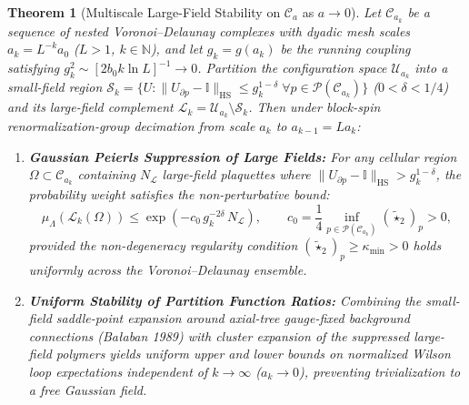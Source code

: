 \documentclass[11pt, a4paper]{article}
\newtheorem{theorem}{Theorem}[section]
\theoremstyle{definition}
\theoremstyle{remark}
\begin{document}
\begin{theorem}[Multiscale Large-Field Stability on $\mathcal{C}_{a}$ as $a \to 0$]
\label{thm:large_field}
Let $\mathcal{C}_{a_{k}}$ be a sequence of nested Voronoi--Delaunay complexes with dyadic mesh scales $a_{k} = L^{-k}a_{0}$ ($L > 1$, $k \in \mathbb{N}$), and let $g_{k} = g(a_{k})$ be the running coupling satisfying $g_{k}^{2} \sim [2b_{0}k\ln L]^{-1} \to 0$. Partition the configuration space $\mathcal{U}_{a_{k}}$ into a small-field region $\mathcal{S}_{k} = \{U : \|U_{\partial p} - \mathbb{I}\|_{\mathrm{HS}} \le g_{k}^{1-\delta} \;\forall p \in \mathcal{P}(\mathcal{C}_{a_{k}})\}$ ($0 < \delta < 1/4$) and its large-field complement $\mathcal{L}_{k} = \mathcal{U}_{a_{k}} \setminus \mathcal{S}_{k}$. Then under block-spin renormalization-group decimation from scale $a_{k}$ to $a_{k-1} = L a_{k}$:
\begin{enumerate}
  \item \textbf{Gaussian Peierls Suppression of Large Fields:} For any cellular region $\Omega \subset \mathcal{C}_{a_{k}}$ containing $N_{\mathcal{L}}$ large-field plaquettes where $\|U_{\partial p} - \mathbb{I}\|_{\mathrm{HS}} > g_{k}^{1-\delta}$, the probability weight satisfies the non-perturbative bound:
  \begin{equation}
    \mu_{\Lambda}\!\left(\mathcal{L}_{k}(\Omega)\right) \le \exp\!\left(-c_{0}\,g_{k}^{-2\delta}\,N_{\mathcal{L}}\right), \qquad c_{0} = \frac{1}{4}\inf_{p \in \mathcal{P}(\mathcal{C}_{a_{k}})} (\tilde{\star}_{2})_{p} > 0,
  \end{equation}
  provided the non-degeneracy regularity condition $(\tilde{\star}_{2})_{p} \ge \kappa_{\min} > 0$ holds uniformly across the Voronoi--Delaunay ensemble.
  \item \textbf{Uniform Stability of Partition Function Ratios:} Combining the small-field saddle-point expansion around axial-tree gauge-fixed background connections (Ba\l{}aban 1989) with cluster expansion of the suppressed large-field polymers yields uniform upper and lower bounds on normalized Wilson loop expectations independent of $k \to \infty$ ($a_{k} \to 0$), preventing trivialization to a free Gaussian field.
\end{enumerate}
\end{theorem}
\end{document}
